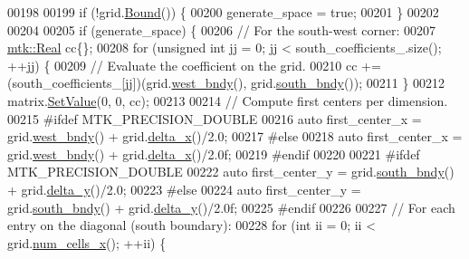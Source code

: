 \begin{DoxyCode}
00198 
00199   \textcolor{keywordflow}{if} (!grid.\hyperlink{classmtk_1_1UniStgGrid2D_aa651194ccd0321a7c61a8f56fa5e8455}{Bound}()) \{
00200     generate\_space = \textcolor{keyword}{true};
00201   \}
00202 
00204 
00205   \textcolor{keywordflow}{if} (generate\_space) \{
00206     \textcolor{comment}{// For the south-west corner:}
00207     \hyperlink{group__c01-roots_gac080bbbf5cbb5502c9f00405f894857d}{mtk::Real} cc\{\};
00208     \textcolor{keywordflow}{for} (\textcolor{keywordtype}{unsigned} \textcolor{keywordtype}{int} jj = 0; jj < south\_coefficients\_.size(); ++jj) \{
00209       \textcolor{comment}{// Evaluate the coefficient on the grid.}
00210       cc += (south\_coefficients\_[jj])(grid.\hyperlink{classmtk_1_1UniStgGrid2D_af2b1712387ded85edaf2b64617d3fc13}{west\_bndy}(), grid.\hyperlink{classmtk_1_1UniStgGrid2D_a1442eaf219f099d0ebf46a170fdebf92}{south\_bndy}());
00211     \}
00212     matrix.\hyperlink{classmtk_1_1DenseMatrix_a784ce5784109ac86bfb9d8562b334b13}{SetValue}(0, 0, cc);
00213 
00214     \textcolor{comment}{// Compute first centers per dimension.}
00215 \textcolor{preprocessor}{    #ifdef MTK\_PRECISION\_DOUBLE}
00216     \textcolor{keyword}{auto} first\_center\_x = grid.\hyperlink{classmtk_1_1UniStgGrid2D_af2b1712387ded85edaf2b64617d3fc13}{west\_bndy}() + grid.\hyperlink{classmtk_1_1UniStgGrid2D_aca4710004c4a7da6a9e8fd6ab32a691f}{delta\_x}()/2.0;
00217 \textcolor{preprocessor}{    #else}
00218     \textcolor{keyword}{auto} first\_center\_x = grid.\hyperlink{classmtk_1_1UniStgGrid2D_af2b1712387ded85edaf2b64617d3fc13}{west\_bndy}() + grid.\hyperlink{classmtk_1_1UniStgGrid2D_aca4710004c4a7da6a9e8fd6ab32a691f}{delta\_x}()/2.0f;
00219 \textcolor{preprocessor}{    #endif}
00220 
00221 \textcolor{preprocessor}{    #ifdef MTK\_PRECISION\_DOUBLE}
00222     \textcolor{keyword}{auto} first\_center\_y = grid.\hyperlink{classmtk_1_1UniStgGrid2D_a1442eaf219f099d0ebf46a170fdebf92}{south\_bndy}() + grid.\hyperlink{classmtk_1_1UniStgGrid2D_a65a78cfc80ffdbeb282ed57af4dc5cb4}{delta\_y}()/2.0;
00223 \textcolor{preprocessor}{    #else}
00224     \textcolor{keyword}{auto} first\_center\_y = grid.\hyperlink{classmtk_1_1UniStgGrid2D_a1442eaf219f099d0ebf46a170fdebf92}{south\_bndy}() + grid.\hyperlink{classmtk_1_1UniStgGrid2D_a65a78cfc80ffdbeb282ed57af4dc5cb4}{delta\_y}()/2.0f;
00225 \textcolor{preprocessor}{    #endif}
00226 
00227     \textcolor{comment}{// For each entry on the diagonal (south boundary):}
00228     \textcolor{keywordflow}{for} (\textcolor{keywordtype}{int} ii = 0; ii < grid.\hyperlink{classmtk_1_1UniStgGrid2D_a2d182866a398aba8e4829590e85bf939}{num\_cells\_x}(); ++ii) \{

\end{DoxyCode}
